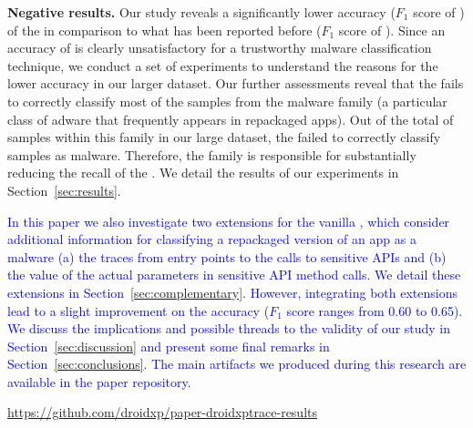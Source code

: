 {\bf Negative results.} Our study reveals a significantly lower
accuracy ($F_1$ score of \fscore) of the \mas in comparison to what has been reported before ($F_1$ score of \fscoreSmall). 
Since an accuracy of \fscore is clearly unsatisfactory for a trustworthy malware classification technique, we conduct a set of experiments 
to understand the reasons for the lower accuracy in our larger dataset.
Our further assessments reveal that the \mas fails to correctly classify most of the samples from
the \gps malware family (a particular class of adware that frequently appears in repackaged apps). 
Out of the total of \appsGps samples within this family in our large dataset, the \mas failed to correctly classify \appsGpsFN samples as malware.
Therefore, the \gps family is responsible for substantially reducing the recall of the \mas. We detail the results of our experiments in Section~\ref{sec:results}. %

\textcolor{blue}{In this paper we also investigate two extensions for the vanilla \mas, which consider additional information for classifying a repackaged version of an app as a malware (a) the traces from entry points to the calls to sensitive APIs and (b) the value of the actual parameters in sensitive API method calls. We detail these extensions in Section~\ref{sec:complementary}. However, integrating both extensions lead to a slight improvement on the \mas accuracy ($F_1$ score ranges from 0.60 to 0.65). We discuss the implications and possible threads to the validity of our study in Section~\ref{sec:discussion} and present some final remarks in Section~\ref{sec:conclusions}. 
The main artifacts we produced during this research are available in the paper repository.}

\begin{small}
  \begin{center}
    \url{https://github.com/droidxp/paper-droidxptrace-results}
  \end{center}
\end{small}

